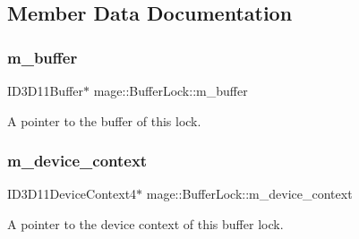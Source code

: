 \subsection{Member Data Documentation}
\hypertarget{classmage_1_1_buffer_lock_a2b676d72e74c0083617e0ed288cc2be7}{}\label{classmage_1_1_buffer_lock_a2b676d72e74c0083617e0ed288cc2be7} 
\subsubsection{\texorpdfstring{m\+\_\+buffer}{m\_buffer}}
{\footnotesize\ttfamily I\+D3\+D11\+Buffer$\ast$ mage\+::\+Buffer\+Lock\+::m\+\_\+buffer\hspace{0.3cm}{\ttfamily [private]}}

A pointer to the buffer of this lock. \hypertarget{classmage_1_1_buffer_lock_ac17b6d4085db4d9c7ebc57c66e9897b8}{}\label{classmage_1_1_buffer_lock_ac17b6d4085db4d9c7ebc57c66e9897b8} 
\subsubsection{\texorpdfstring{m\+\_\+device\+\_\+context}{m\_device\_context}}
{\footnotesize\ttfamily I\+D3\+D11\+Device\+Context4$\ast$ mage\+::\+Buffer\+Lock\+::m\+\_\+device\+\_\+context\hspace{0.3cm}{\ttfamily [private]}}

A pointer to the device context of this buffer lock. 